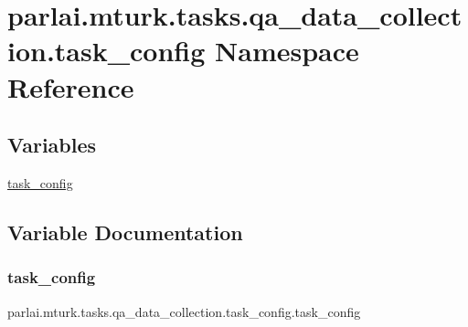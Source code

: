 \hypertarget{namespaceparlai_1_1mturk_1_1tasks_1_1qa__data__collection_1_1task__config}{}\section{parlai.\+mturk.\+tasks.\+qa\+\_\+data\+\_\+collection.\+task\+\_\+config Namespace Reference}
\label{namespaceparlai_1_1mturk_1_1tasks_1_1qa__data__collection_1_1task__config}
\subsection*{Variables}
\begin{DoxyCompactItemize}
\item 
\hyperlink{namespaceparlai_1_1mturk_1_1tasks_1_1qa__data__collection_1_1task__config_a64b1644ceb3726f33dbabbf7bb27bf8b}{task\+\_\+config}
\end{DoxyCompactItemize}


\subsection{Variable Documentation}
\mbox{\label{namespaceparlai_1_1mturk_1_1tasks_1_1qa__data__collection_1_1task__config_a64b1644ceb3726f33dbabbf7bb27bf8b}} 
\subsubsection{\texorpdfstring{task\+\_\+config}{task\_config}}
{\footnotesize\ttfamily parlai.\+mturk.\+tasks.\+qa\+\_\+data\+\_\+collection.\+task\+\_\+config.\+task\+\_\+config}

